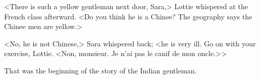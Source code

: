 <There is such a yellow gentleman next door, Sara,> Lottie whispered at the French class afterward. <Do you think he is a Chinee? The geography says the Chinee men are yellow.>

<No, he is not Chinese,> Sara whispered back; <he is very ill. Go on with your exercise, Lottie. <\textfrench{Non, monsieur. Je n'ai pas le canif de mon oncle.}>>

That was the beginning of the story of the Indian gentleman.